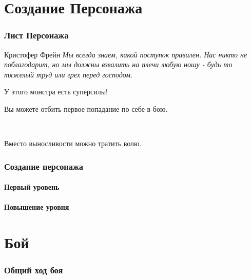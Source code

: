\documentclass[10pt,twoside,twocolumn,openany]{book}
\begin{document}
\selectfont
\tableofcontents

\clearpage
\part{Создание Персонажа}
\onecolumn
\section{Лист Персонажа}
\begin{monsterbox}{Кристофер Фрейн}
	\textit{Мы всегда знаем, какой поступок правилен. Нас никто не поблагодарит, но мы должны взвалить 
	на плечи любую ношу - будь то тяжелый труд или грех перед господом.}\\
	\hline
	\stats[STR = \stat{8}, DEX = \stat{9}, CON = \stat{10}, INT = \stat{35}, WIT = \stat{38}, WIL = \stat{50}]
	\hline
	\basics[armorclass = 12, hitpoints = 16 (3d8+3), speed = 50 ft]
	\hline
	\details[languages = {Лисп, Эрланг},]
	\hline
	\begin{monsteraction}[Суперсилы]
		У этого монстра есть суперсилы!
	\end{monsteraction}
	\begin{monsteraction}
		Вы можете отбить первое попадание по себе в бою.
	\end{monsteraction}\\
	\begin{monsteraction}
		Вместо выносливости можно тратить волю.
	\end{monsteraction}
\end{monsterbox}
\twocolumn
\clearpage

\section{Создание персонажа}
\lipsum[1]
\subsection{Первый уровень}
\lipsum[1]
\subsection{Повышение уровня}
\lipsum[1]

\part{Бой}
\section{Общий ход боя}
\lipsum[1]
\end{document}
